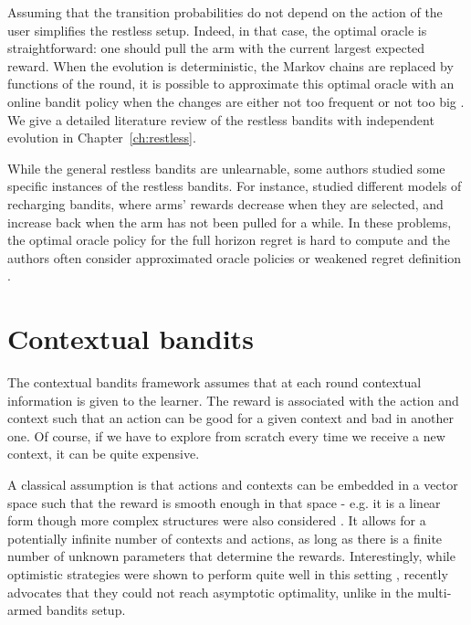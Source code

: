 {Assuming that the transition probabilities do not depend on the action of the user simplifies the restless setup. Indeed, in that case, the optimal oracle is straightforward: one should pull the arm with the current largest expected reward. When the evolution is deterministic, \ie the Markov chains are replaced by functions of the round, it is possible to approximate this optimal oracle with an online bandit policy when the changes are either not too frequent \citep{garivier2011upper-confidence-bound} or not too big \citep{besbes2014stochastic}. We give a detailed literature review of the restless bandits with independent evolution in Chapter~\ref{ch:restless}.

While the general restless bandits are unlearnable, some authors studied some specific instances of the restless bandits. For instance,  \citet{immorlica2018recharging, pikeburke2019recovering, cella2020stochastic} studied different models of recharging bandits, where arms' rewards decrease when they are selected, and increase back when the arm has not been pulled for a while. In these problems, the optimal oracle policy for the full horizon regret is hard to compute and the authors often consider approximated oracle policies \citep{immorlica2018recharging, cella2020stochastic} or weakened regret definition \citep{pikeburke2019recovering}.

\section{Contextual bandits}
\label{sec:contextual}
The contextual bandits framework \citep{tewari2017contextual} assumes that at each round contextual information is given to the learner. The reward is associated with the action and context such that an action can be good for a given context and bad in another one. Of course, if we have to explore from scratch every time we receive a new context, it can be quite expensive. 

A classical assumption is that actions and contexts can be embedded in a vector space such that the reward is smooth enough in that space - e.g. it is a linear form \citep{abe1999associative, auer2002using, abbasi2011improved, lattimore2017end} though more complex structures were also considered \citep{filippi2010parametric, valko2013finite, valko2014spectral}. It allows for a potentially infinite number of contexts and actions, as long as there is a finite number of unknown parameters that determine the rewards. Interestingly, while optimistic strategies were shown to perform quite well in this setting \citep{abbasi2011improved}, \citet{lattimore2017end} recently advocates that they could not reach asymptotic optimality, unlike in the multi-armed bandits setup. 

}
